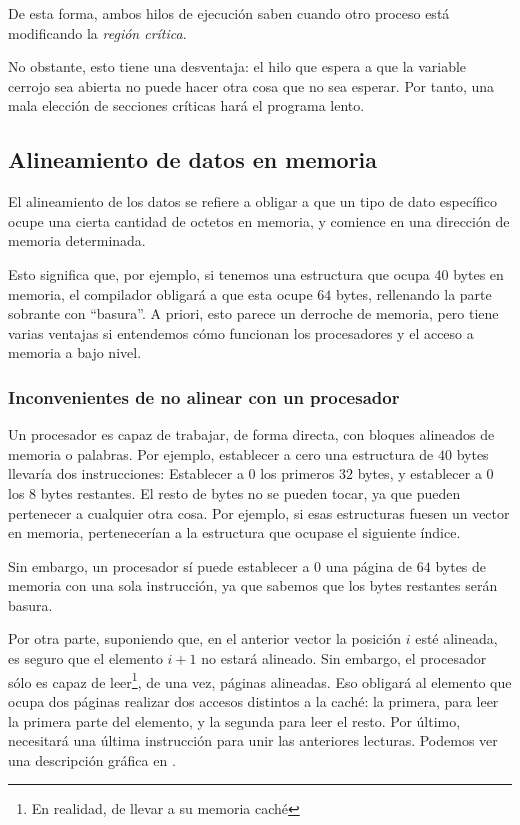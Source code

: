 De esta forma, ambos hilos de ejecución saben cuando otro proceso está modificando la \emph{región crítica}.

No obstante, esto tiene una desventaja: el hilo que espera a que la variable cerrojo sea abierta no puede hacer otra 
cosa que no sea esperar. Por tanto, una mala elección de secciones críticas hará el programa lento.

\subsection{Alineamiento de datos en memoria}
El alineamiento de los datos se refiere a obligar a que un 
tipo de dato específico ocupe una cierta cantidad de octetos en memoria, y comience en una dirección de memoria 
determinada.

Esto significa que, por ejemplo, si tenemos una estructura que ocupa $40$ bytes en memoria, el compilador obligará a 
que esta ocupe $64$ bytes, rellenando la parte sobrante con ``basura''. A priori, esto parece un derroche de memoria, 
pero tiene varias ventajas si entendemos cómo funcionan los procesadores y el acceso a memoria a bajo nivel.

\subsubsection{Inconvenientes de no alinear con un procesador}
Un procesador es capaz de trabajar, de forma directa, con bloques alineados de memoria o palabras. Por ejemplo, 
establecer a cero una estructura de $40$ bytes llevaría dos instrucciones: Establecer a $0$ los primeros $32$ bytes, y 
establecer a $0$ los $8$ bytes restantes. El resto de bytes no se pueden tocar, ya que pueden pertenecer a cualquier 
otra cosa. Por ejemplo, si esas estructuras fuesen un vector en memoria, pertenecerían a la estructura que ocupase el 
siguiente índice.

Sin embargo, un procesador sí puede establecer a $0$ una página de $64$ bytes de memoria con una sola instrucción, ya 
que sabemos que los bytes restantes serán basura.

Por otra parte, suponiendo que, en el anterior vector la posición $i$ esté alineada, es seguro que el elemento $i+1$ no 
estará alineado. Sin embargo, el procesador sólo es capaz de leer\footnote{En realidad, de llevar a su memoria caché}, 
de una vez, páginas alineadas. Eso obligará al elemento que ocupa dos páginas realizar dos accesos distintos a la 
caché: la primera, para leer la primera parte del elemento, y la segunda para leer el resto. Por último, necesitará una 
última instrucción para unir las anteriores lecturas. Podemos ver una descripción gráfica en 
.

